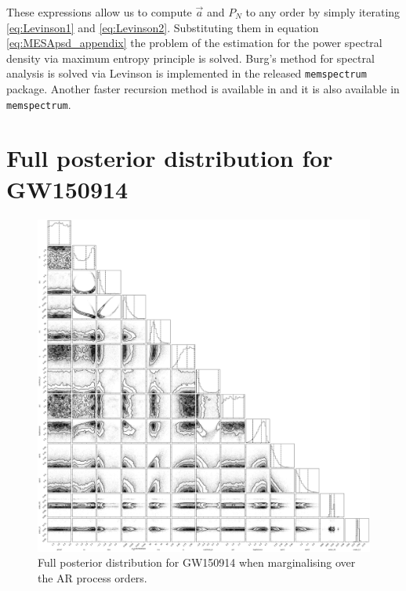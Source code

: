 \documentclass{aa}
\begin{document}
\begin{appendix}
These expressions allow us to compute $\vec a$ and $P_N$ to any order by simply iterating \eqref{eq:Levinson1} and \eqref{eq:Levinson2}. Substituting them in equation \eqref{eq:MESApsd_appendix} the problem of the estimation for the power spectral density via maximum entropy principle is solved.
Burg's method for spectral analysis is solved via Levinson is implemented in the released \texttt{memspectrum} package.
Another faster recursion method is available in \citet{Vos} and it is also available in \texttt{memspectrum}.

\section{Full posterior distribution for GW150914} \label{sec:appendix_b}
\begin{figure}
	\caption{Full posterior distribution for GW150914 when marginalising over the AR process orders.}
	\label{fig:gw150914_full_pe}
	\includegraphics[width=\textwidth,keepaspectratio]{Images/gw150914/mega_plot.pdf}
\end{figure}
\end{appendix}
\end{document}
